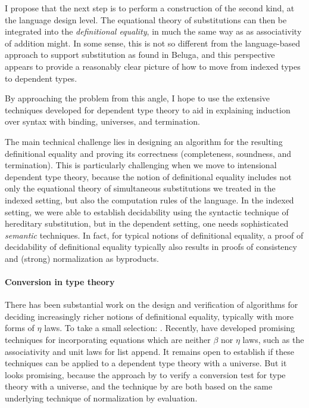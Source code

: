 \documentclass{article}
\begin{document}
I propose that the next step is to perform a construction of the
second kind, at the language design level. The equational theory of
substitutions can then be integrated into the \emph{definitional
 equality}, in much the same way as as associativity of addition
might. In some sense, this is not so
different from the language-based approach to support
substitution as found in Beluga, and this perspective appears to
provide a reasonably clear
picture of how to move from indexed types to dependent types.

By approaching the problem from this angle, I hope to use the
extensive techniques developed for dependent type theory to aid in
explaining induction over syntax with binding, universes, and
termination.

The main technical challenge lies in designing an algorithm for the
resulting definitional equality and proving its correctness
(completeness, soundness, and termination). This is particularly
challenging when we move to intensional dependent type theory, because
the notion of definitional equality includes not only the 
equational theory of simultaneous substitutions we treated in the
indexed setting, but also the computation rules of the language. In
the indexed setting, we were able to establish decidability using the
syntactic technique of hereditary substitution, but in the dependent
setting, one needs sophisticated \emph{semantic} techniques. In fact,
for typical notions of definitional equality, a proof of decidability
of definitional equality typically also results in proofs of
consistency and (strong) normalization as byproducts.


\paragraph{Conversion in type theory} There has been substantial work on the design and verification
of algorithms for deciding increasingly richer notions of definitional
equality, typically with more forms of $\eta$ laws. To take a
small selection: \cite{Coquand91,Harper05,Abel11}. Recently,
\cite{Allais13} have developed promising techniques for incorporating equations
which are neither $\beta$ nor $\eta$ laws, such as the associativity
and unit laws for list append. It remains open to establish if 
these techniques can be applied to a dependent type theory with a
universe. But it looks promising, because the approach by
\cite{Abel07} to verify a conversion test for type theory with a
universe, and the technique by \cite{Allais13} are both based on the
same underlying technique of normalization by evaluation.
\end{document}
